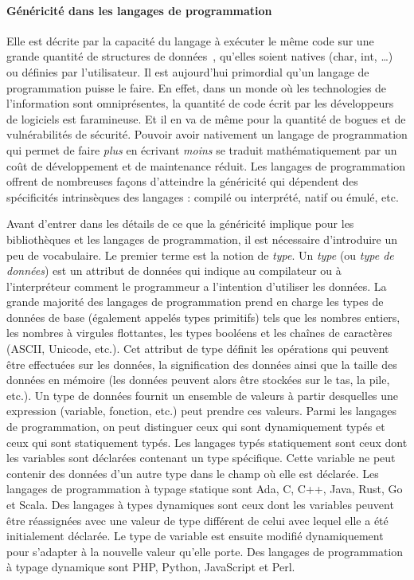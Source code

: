 \paragraph{Généricité dans les langages de programmation} Elle est décrite par la capacité du langage à exécuter le même
code sur une grande quantité de structures de données~\parencite{dehnert.1998.fundamentals}, qu'elles soient natives
(char, int, \ldots) ou définies par l'utilisateur. Il est aujourd'hui primordial qu'un langage de programmation puisse
le faire. En effet, dans un monde où les technologies de l'information sont omniprésentes, la quantité de code écrit par
les développeurs de logiciels est faramineuse. Et il en va de même pour la quantité de bogues et de vulnérabilités de
sécurité. Pouvoir avoir nativement un langage de programmation qui permet de faire \emph{plus} en écrivant \emph{moins}
se traduit mathématiquement par un coût de développement et de maintenance réduit. Les langages de programmation offrent
de nombreuses façons d'atteindre la généricité qui dépendent des spécificités intrinsèques des langages : compilé ou
interprété, natif ou émulé, etc.

Avant d'entrer dans les détails de ce que la généricité implique pour les bibliothèques et les langages de
programmation, il est nécessaire d'introduire un peu de vocabulaire. Le premier terme est la notion de \emph{type}. Un
\emph{type} (ou \emph{type de données}) est un attribut de données qui indique au compilateur ou à l'interpréteur
comment le programmeur a l'intention d'utiliser les données. La grande majorité des langages de programmation prend en
charge les types de données de base (également appelés types primitifs) tels que les nombres entiers, les nombres à
virgules flottantes, les types booléens et les chaînes de caractères (ASCII, Unicode, etc.). Cet attribut de type
définit les opérations qui peuvent être effectuées sur les données, la signification des données ainsi que la taille des
données en mémoire (les données peuvent alors être stockées sur le tas, la pile, etc.). Un type de données fournit un
ensemble de valeurs à partir desquelles une expression (\cad variable, fonction, etc.) peut prendre ces valeurs. Parmi
les langages de programmation, on peut distinguer ceux qui sont dynamiquement typés et ceux qui sont statiquement typés.
Les langages typés statiquement sont ceux dont les variables sont déclarées contenant un type spécifique. Cette variable
ne peut contenir des données d'un autre type dans le champ où elle est déclarée. Les langages de programmation à typage
statique sont Ada, C, C++, Java, Rust, Go et Scala. Des langages à types dynamiques sont ceux dont les variables peuvent
être réassignées avec une valeur de type différent de celui avec lequel elle a été initialement déclarée. Le type de
variable est ensuite modifié dynamiquement pour s'adapter à la nouvelle valeur qu'elle porte. Des langages de
programmation à typage dynamique sont PHP, Python, JavaScript et Perl.

